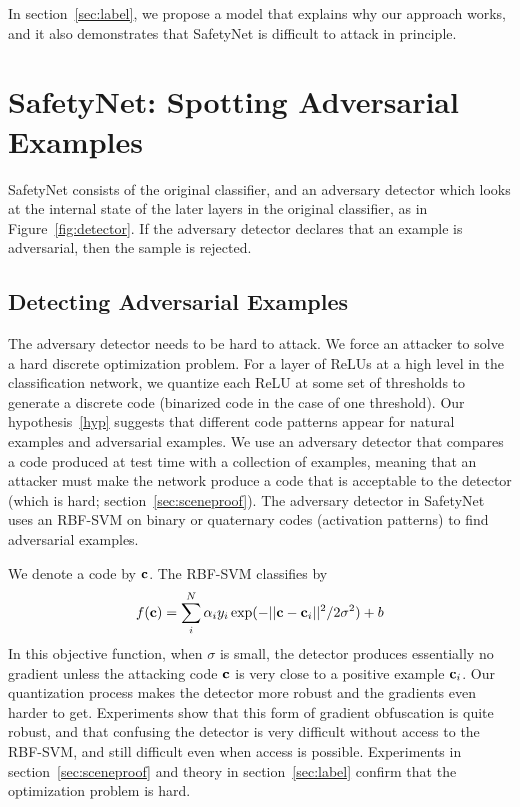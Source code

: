 \documentclass[10pt,twocolumn,letterpaper]{article}
\newcommand{\vect}[1]{{\bf {#1}}}
\begin{document}
In section~\ref{sec:label}, we propose a model that explains why our approach works, and it also demonstrates that
SafetyNet is difficult to attack in principle.


\section{SafetyNet: Spotting Adversarial Examples}
\label{sec:safetynet}
SafetyNet consists of the original classifier, and an adversary detector which looks at the internal state of the later layers in
the original classifier, as in Figure~\ref{fig:detector}. If the adversary detector declares that an example is adversarial, then
the sample is rejected. 



\subsection{Detecting Adversarial Examples}

The adversary detector needs to be hard to attack.  We force an attacker to solve a hard discrete optimization
problem.  For a layer of ReLUs at a high level in the classification network, we quantize each ReLU at some
set of thresholds to generate a  discrete code (binarized code in the case of one threshold).  
Our hypothesis~\ref{hyp} suggests that different code patterns appear for natural examples and
adversarial examples.  We use an adversary detector that compares a code produced at test time with a collection of 
examples, meaning that an attacker must make the network produce a code that is acceptable to the detector (which is
hard; section~\ref{sec:sceneproof}).  The adversary detector in  SafetyNet uses an RBF-SVM on binary or quaternary codes (activation patterns) to find
adversarial examples.  

We denote a code by $\vect{c}$. The RBF-SVM classifies by
\begin{equation}
f(\vect{c}) = \sum_i^N \alpha_i y_i \exp(-||\vect{c} - \vect{c}_i||^2 / 2\sigma^2) + b
\end{equation}
In this objective function, when $\sigma$ is small, the detector produces essentially no gradient unless the attacking code $\vect{c}$ 
is very close to a positive example $\vect{c}_i$.  Our quantization process makes the detector more robust and the gradients 
even harder to get. Experiments show that this form of gradient obfuscation is quite robust, 
and that confusing the detector is very difficult without access to the RBF-SVM, and still difficult even when access is possible.  
Experiments in section~\ref{sec:sceneproof} and theory in section~\ref{sec:label} confirm that the optimization problem is hard.
\end{document}
